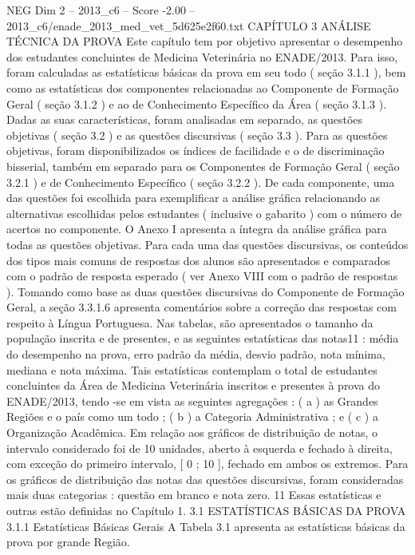 \begin{textsample}{NEG Dim 2 – 2013\_c6 – Score -2.00 – 2013\_c6/enade\_2013\_med\_vet\_5d625e2f60.txt}  \label{ex:f2_neg_057}
CAPÍTULO 3 ANÁLISE TÉCNICA DA PROVA Este capítulo tem por objetivo apresentar o desempenho dos estudantes concluintes de Medicina Veterinária no ENADE/2013.
Para isso, foram calculadas as estatísticas básicas da prova em seu todo ( seção 3.1.1 ), bem como as estatísticas dos componentes relacionadas ao Componente de Formação Geral ( seção 3.1.2 ) e ao de Conhecimento Específico da Área ( seção 3.1.3 ).
Dadas as suas características, foram analisadas em separado, as questões objetivas ( seção 3.2 ) e as questões discursivas ( seção 3.3 ).
Para as questões objetivas, foram disponibilizados os índices de facilidade e o de discriminação bisserial, também em separado para os Componentes de Formação Geral ( seção 3.2.1 ) e de Conhecimento Específico ( seção 3.2.2 ).
De cada componente, uma das questões foi escolhida para exemplificar a análise gráfica relacionando as alternativas escolhidas pelos estudantes ( inclusive o gabarito ) com o número de acertos no componente.
O Anexo I apresenta a íntegra da análise gráfica para todas as questões objetivas.
Para cada uma das questões discursivas, os conteúdos dos tipos mais comuns de respostas dos alunos são apresentados e comparados com o padrão de resposta esperado ( ver Anexo VIII com o padrão de respostas ).
Tomando como base as duas questões discursivas do Componente de Formação Geral, a seção 3.3.1.6 apresenta comentários sobre a correção das respostas com respeito à Língua Portuguesa.
Nas tabelas, são apresentados o tamanho da população inscrita e de presentes, e as seguintes estatísticas das notas11 : média do desempenho na prova, erro padrão da média, desvio padrão, nota mínima, mediana e nota máxima.
Tais estatísticas contemplam o total de estudantes concluintes da Área de Medicina Veterinária inscritos e presentes à prova do ENADE/2013, tendo -se em vista as seguintes agregações : ( a ) as Grandes Regiões e o país como um todo ; ( b ) a Categoria Administrativa ; e ( c ) a Organização Acadêmica.
Em relação aos gráficos de distribuição de notas, o intervalo considerado foi de 10 unidades, aberto à esquerda e fechado à direita, com exceção do primeiro intervalo, [ 0 ; 10 ], fechado em ambos os extremos.
Para os gráficos de distribuição das notas das questões discursivas, foram consideradas mais duas categorias : questão em branco e nota zero. 11 Essas estatísticas e outras estão definidas no Capítulo 1. 3.1 ESTATÍSTICAS BÁSICAS DA PROVA 3.1.1 Estatísticas Básicas Gerais A Tabela 3.1 apresenta as estatísticas básicas da prova por grande Região.

\end{textsample}
